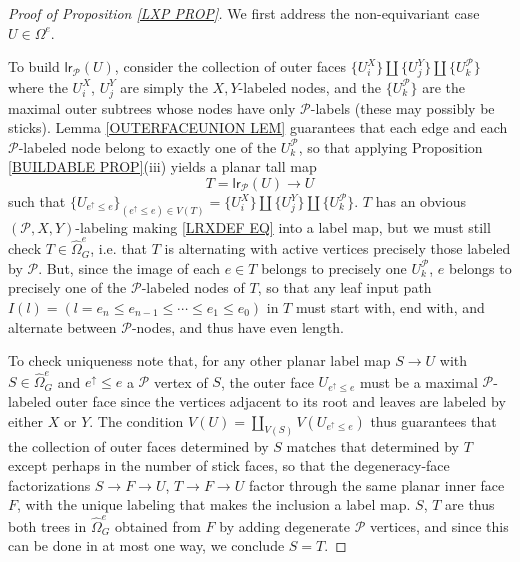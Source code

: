 \documentclass[a4paper,10pt
,draft
]{article}%
\numberwithin{equation}{section}
\numberwithin{figure}{section}
\theoremstyle{definition} %
\newcommand{\1}{\ensuremath{\mathbbm 1}}%
\begin{document}
\begin{proof}[Proof of Proposition \ref{LXP PROP}]
	We first address the non-equivariant case $U \in \Omega^e$.

	To build $\mathsf{lr}_{\mathcal{P}}(U)$, consider the collection of outer faces
	$\{U_i^X\} \amalg \{U_j^Y\} \amalg \{U_k^{\mathcal{P}}\}$
where the $U_i^X$, $U_j^Y$ are simply the $X,Y$-labeled nodes,
and the $\{U_k^{\mathcal{P}}\}$ are the maximal outer subtrees whose nodes have only $\mathcal{P}$-labels (these may possibly be sticks). 
Lemma \ref{OUTERFACEUNION LEM} guarantees that 
each edge and each $\mathcal{P}$-labeled node belong to exactly
one of the $U_k^{\mathcal{P}}$, 
so that applying Proposition \ref{BUILDABLE PROP}(iii)
yields a planar tall map
\begin{equation}\label{LRXDEF EQ}
T = \mathsf{lr}_{\mathcal{P}}(U) \to U
\end{equation}
such that $\{U_{e^{\uparrow} \leq e}\}_{(e^{\uparrow} \leq e) \in V(T)}
 = \{U_i^X\} \amalg \{U_j^Y\} \amalg 
 \{U_k^{\mathcal{P}}\}$. 
 $T$ has an obvious $(\mathcal{P},X,Y)$-labeling making 
\eqref{LRXDEF EQ} into a label map, but we must still check $T \in \widehat{\Omega}^{e}_G$, i.e. that 
$T$ is alternating with active vertices precisely those labeled by $\mathcal{P}$.
But, since the image of each $e \in T$
belongs to precisely one $U_k^{\mathcal{P}}$,
$e$ belongs to precisely one of the $\mathcal{P}$-labeled nodes of $T$, so that any leaf input path
$I(l) = (l = e_n \leq e_{n-1} \leq \cdots \leq e_1 \leq e_0)$
in $T$ must start with, end with, and alternate between 
$\mathcal{P}$-nodes, and thus have even length.

To check uniqueness note that, 
for any other planar label map $S \to U$ with 
$S \in \widehat{\Omega}_G^e$
and $e^{\uparrow} \leq e$ a $\mathcal{P}$ vertex of $S$,
the outer face 
$U_{e^{\uparrow} \leq e}$
must be a maximal 
$\mathcal{P}$-labeled outer face since the vertices adjacent to its root and leaves are labeled by either $X$ or $Y$.
The condition 
$V(U) = \coprod_{V(S)} V(U_{e^{\uparrow} \leq e})$
thus guarantees that the collection of outer faces determined by $S$ matches that determined by $T$
except perhaps in the number of stick faces, so that 
the degeneracy-face factorizations
$S \to F \to U$, $T \to F \to U$
factor through the same planar inner face $F$, with the  unique labeling that makes the inclusion a label map.
$S$, $T$ are thus both trees in $\widehat{\Omega}_G^e$ obtained from $F$ by adding degenerate $\mathcal{P}$ vertices, 
and since this can be done in at most one way, we conclude 
$S=T$. 


\end{proof}
\end{document}
